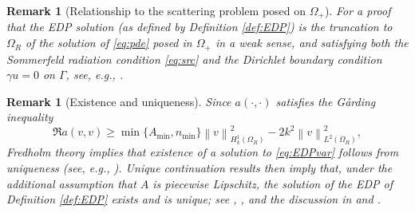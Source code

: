 \documentclass[10pt]{article}%
\newtheorem{remark}[theorem]{Remark}
\numberwithin{equation}{section}
\newcommand{\beq}{\begin{equation}}
\newcommand{\eeq}{\end{equation}}
\newcommand{\bit}{\begin{itemize}}
\newcommand{\eit}{\end{itemize}}
\newcommand{\bre}{\begin{remark}}
\newcommand{\ere}{\end{remark}}
\newcommand{\noi}{\noindent}
\newcommand{\Oe}{{\Omega_+}}
\newcommand{\OR}{{\Omega_R}}
\newcommand{\HoDk}{{H^1_{0,D}(\domain_R)}}
\newcommand{\HoDkk}{{H^1_{k}(\domain_R)}}
\newcommand*{\N}[1]{\left\|#1\right\|}
\newcommand{\domain}{\Omega}
\begin{document}
\bre[Relationship to the scattering problem posed on $\Oe$]
For a proof that the EDP solution (as defined by Definition \ref{def:EDP}) is the truncation to $\Omega_R$ of the solution of \eqref{eq:pde} posed in $\Oe$ in a weak sense, and satisfying both the Sommerfeld radiation condition \eqref{eq:src} and the Dirichlet boundary condition $\gamma u =0$ on $\Gamma$, see, e.g., \cite[Lemma 3.3]{GrPeSp:18}.
\ere

\bre[Existence and uniqueness]
Since $a(\cdot,\cdot)$ satisfies the G\aa rding inequality 
\beq\label{eq:Garding}
\Re a(v,v) \geq \min\big\{ A_{\min}, n_{\min}\big\} \N{v}^2_{\HoDkk} - 2k^2 \N{v}^2_{L^2(\Omega_R)},
\eeq
Fredholm theory implies that existence of a solution to \eqref{eq:EDPvar} follows from uniqueness (see, e.g., \cite[Theorem 2.34]{Mc:00}).
Unique continuation results then imply that, under the additional assumption that $A$ is piecewise Lipschitz, the solution of the EDP of Definition \ref{def:EDP} exists and is unique; see \cite{GaLi:87}, \cite{BaCaTs:12}, and the discussion in \cite[\S1 and \S2.4]{GrPeSp:18} and \cite[\S]{GrSa:18}.
\ere


\end{document}
